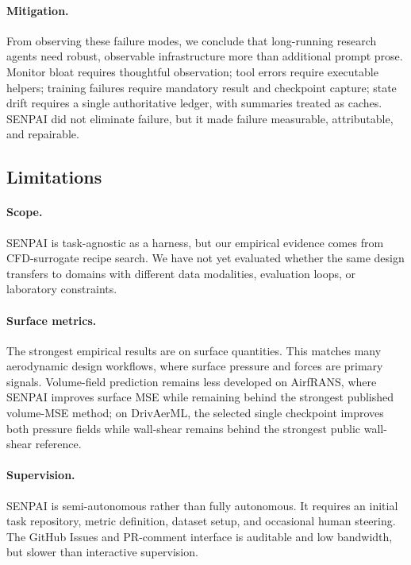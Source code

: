 \documentclass{article}
\begin{document}
\paragraph{Mitigation.}
From observing these failure modes, we conclude that long-running research agents need robust, observable infrastructure more than additional prompt prose. Monitor bloat requires thoughtful observation; tool errors require executable helpers; training failures require mandatory result and checkpoint capture; state drift requires a single authoritative ledger, with summaries treated as caches. SENPAI did not eliminate failure, but it made failure measurable, attributable, and repairable.

\subsection{Limitations}

\paragraph{Scope.}
SENPAI is task-agnostic as a harness, but our empirical evidence comes from CFD-surrogate recipe search. We have not yet evaluated whether the same design transfers to domains with different data modalities, evaluation loops, or laboratory constraints.

\paragraph{Surface metrics.}
The strongest empirical results are on surface quantities. This matches many aerodynamic design workflows, where surface pressure and forces are primary signals. Volume-field prediction remains less developed on AirfRANS, where SENPAI improves surface MSE while remaining behind the strongest published volume-MSE method; on DrivAerML, the selected single checkpoint improves both pressure fields while wall-shear remains behind the strongest public wall-shear reference.

\paragraph{Supervision.}
SENPAI is semi-autonomous rather than fully autonomous. It requires an initial task repository, metric definition, dataset setup, and occasional human steering. The GitHub Issues and PR-comment interface is auditable and low bandwidth, but slower than interactive supervision.
\end{document}
